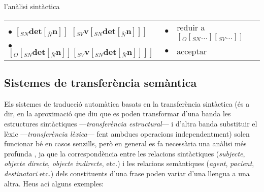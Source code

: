 \begin{persabermes}{l'anàlisi sintàctica}
\begin{center}
\begin{tabular}{l|r|l}
  \\
  $\bullet$ $[_{SN} \textbf{det} [_{\bar{N}} \textbf{n} ] ]$
  $[_{SV} \textbf{v}  [_{SN} \textbf{det} [_{\bar{N}} \textbf{n} ] ] ]$
  & 
  $\bullet$
  & 
  reduir a $[_O [_{SN} \ldots ] [_{SV} \ldots ] ]$
  \\
  $\bullet$ $[_O [_{SN} \textbf{det} [_{\bar{N}} \textbf{n} ] ] [_{SV} \textbf{v}  [_{SN} \textbf{det} [_{\bar{N}} \textbf{n} ]
  ] ] ]$
  & 
  $\bullet$
  & 
  acceptar
  \\
  \hline
  \end{tabular}
\end{center}
\end{persabermes}


\subsection{Sistemes de transferència semàntica}
\label{s3:transsem}

Els sistemes de traducció automàtica basats en la transferència
sintàctica (és a dir, en la aproximació que diu que es poden
transformar d'una banda les estructures sintàctiques
---\emph{transferència estructural}--- i d'altra banda substituir el
lèxic ---\emph{transferència lèxica}--- fent ambdues operacions
independentment) solen funcionar bé en casos senzills, però en general
es fa necessària una anàlisi més profunda \citep{hovy93j}, ja que la
correspondència entre les relacions sintàctiques (\emph{subjecte},
\emph{objecte directe}, \emph{objecte indirecte}, etc.)  i les
relacions semàntiques (\emph{agent}, \emph{pacient},
\emph{destinatari} etc.)  dels constituents d'una frase poden variar
d'una llengua a una altra.  Heus ací alguns exemples:

